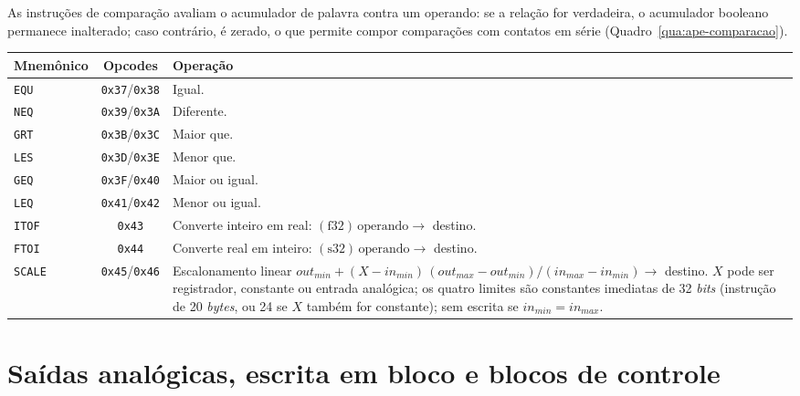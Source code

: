 As instruções de comparação avaliam o acumulador de palavra contra um operando: se a relação for verdadeira, o acumulador booleano permanece inalterado; caso contrário, é zerado, o que permite compor comparações com contatos em série (Quadro~\ref{qua:ape-comparacao}).

\begin{quadrofixo}
    \centering
    \begin{tabular}{|l|c|p{9.4cm}|}
        \hline
        Mnemônico & Opcodes & Operação \\
        \hline
        \texttt{EQU} & \texttt{0x37}/\texttt{0x38} & Igual. \\
        \hline
        \texttt{NEQ} & \texttt{0x39}/\texttt{0x3A} & Diferente. \\
        \hline
        \texttt{GRT} & \texttt{0x3B}/\texttt{0x3C} & Maior que. \\
        \hline
        \texttt{LES} & \texttt{0x3D}/\texttt{0x3E} & Menor que. \\
        \hline
        \texttt{GEQ} & \texttt{0x3F}/\texttt{0x40} & Maior ou igual. \\
        \hline
        \texttt{LEQ} & \texttt{0x41}/\texttt{0x42} & Menor ou igual. \\
        \hline
        \texttt{ITOF} & \texttt{0x43} & Converte inteiro em real: $(\text{f32})\,\text{operando} \rightarrow$ destino. \\
        \hline
        \texttt{FTOI} & \texttt{0x44} & Converte real em inteiro: $(\text{s32})\,\text{operando} \rightarrow$ destino. \\
        \hline
        \texttt{SCALE} & \texttt{0x45}/\texttt{0x46} & Escalonamento linear $out_{min} + (X - in_{min})\,(out_{max} - out_{min}) / (in_{max} - in_{min}) \rightarrow$ destino. $X$ pode ser registrador, constante ou entrada analógica; os quatro limites são constantes imediatas de 32 \textit{bits} (instrução de 20 \textit{bytes}, ou 24 se $X$ também for constante); sem escrita se $in_{min} = in_{max}$. \\
        \hline
    \end{tabular}
    \label{qua:ape-comparacao}
\end{quadrofixo}

\section{Saídas analógicas, escrita em bloco e blocos de controle}
\label{sec:ape-isa-blocos}


